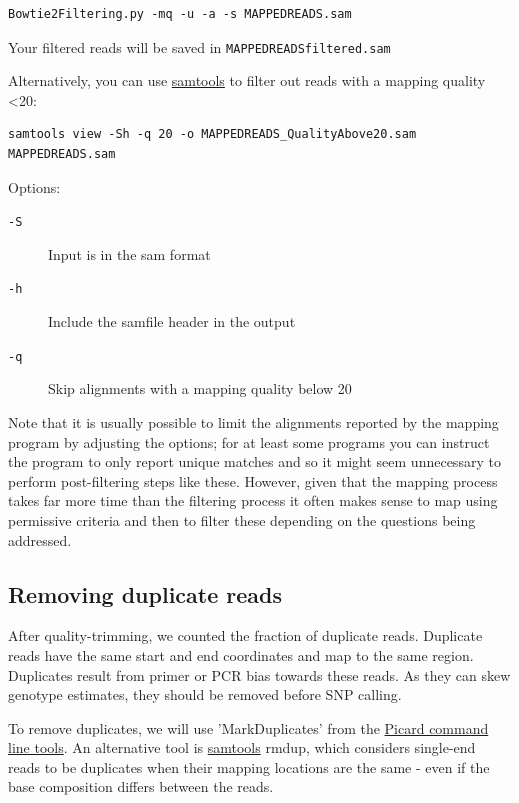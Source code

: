 \documentclass[11pt]{article}
\begin{document}
\begin{verbatim}
Bowtie2Filtering.py -mq -u -a -s MAPPEDREADS.sam
\end{verbatim}

Your filtered reads will be saved in \texttt{MAPPEDREADSfiltered.sam}

Alternatively, you can 
use \href{http://samtools.sourceforge.net/samtools.shtml#mpileup}{samtools} to filter out reads with a mapping quality <20:

\begin{verbatim}
samtools view -Sh -q 20 -o MAPPEDREADS_QualityAbove20.sam MAPPEDREADS.sam
\end{verbatim}

Options:

\begin{description}
\item[{\texttt{-S}}] Input is in the sam format
\item[{\texttt{-h}}] Include the samfile header in the output
\item[{\texttt{-q}}] Skip alignments with a mapping quality below 20
\end{description}

Note that it is usually possible to limit the alignments reported by the
mapping program by adjusting the options; for at least some programs you can
instruct the program to only report unique matches and so it might seem
unnecessary to perform post-filtering steps like these. However, given that
the mapping process takes far more time than the filtering process it often
makes sense to map using permissive criteria and then to filter these
depending on the questions being addressed.

\subsection{Removing duplicate reads}
\label{sec:orgheadline4}
After quality-trimming, we counted the fraction of duplicate
reads. Duplicate reads have the same start and end
coordinates and map to the same region. Duplicates result from primer
or PCR bias towards these reads. As they can skew genotype estimates,
they should be removed before SNP calling.

To remove duplicates, we will use 'MarkDuplicates' from the \href{https://broadinstitute.github.io/picard/command-line-overview.html}{Picard
command line tools}. An alternative tool is \href{http://samtools.sourceforge.net/samtools.shtml}{samtools} rmdup, which
considers single-end reads to be duplicates when their mapping
locations are the same - even if the base composition differs between
the reads.
\end{document}
